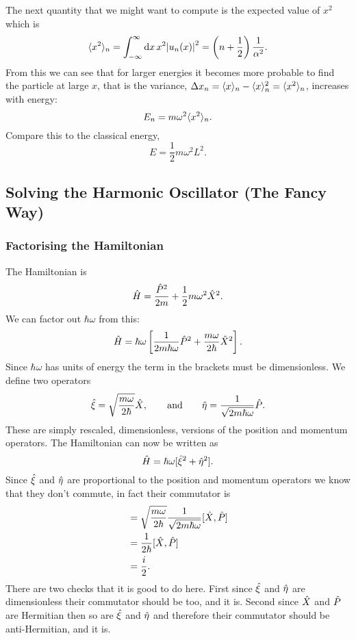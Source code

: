     The next quantity that we might want to compute is the expected value of \(x^2\) which is
    \[\langle{x^2}\rangle_n = \int_{-\infty}^{\infty} \dd{x} x^2\abs{u_n(x)}^2 = \left(n + \frac{1}{2}\right)\frac{1}{\alpha^2}.\]
    From this we can see that for larger energies it becomes more probable to find the particle at large \(x\), that is the variance, \(\Delta x_n = \langle{x}\rangle_n - \langle{x}\rangle_n^2 = \langle{x^2}\rangle_n\), increases with energy:
    \[E_n = m\omega^2\langle{x^2}\rangle_n.\]
    Compare this to the classical energy,
    \[E = \frac{1}{2}m\omega^2L^2.\]
    
    \subsection{Solving the Harmonic Oscillator (The Fancy Way)}
    \subsubsection{Factorising the Hamiltonian}
    The Hamiltonian is
    \[\hat{H} = \frac{\hat{P}^2}{2m} + \frac{1}{2}m\omega^2\hat{X}^2.\]
    We can factor out \(\hbar\omega\) from this:
    \[\hat{H} = \hbar\omega\left[\frac{1}{2m\hbar\omega}\hat{P}^2 + \frac{m\omega}{2\hbar}\hat{X}^2 \right].\]
    Since \(\hbar\omega\) has units of energy the term in the brackets must be dimensionless.
    We define two operators
    \[\hat{\xi} = \sqrt{\frac{m\omega}{2\hbar}}\hat{X}, \qquad\text{and}\qquad \hat{\eta} = \frac{1}{\sqrt{2m\hbar\omega}}\hat{P}.\]
    These are simply rescaled, dimensionless, versions of the position and momentum operators.
    The Hamiltonian can now be written as
    \[\hat{H} = \hbar\omega[\hat{\xi}^2 + \hat{\eta}^2].\]
    Since \(\hat{\xi}\) and \(\hat{\eta}\) are proportional to the position and momentum operators we know that they don't commute, in fact their commutator is
    \begin{align*}
        [\operator{\xi}, \operator{\eta}] &= \sqrt{\frac{m\omega}{2\hbar}}\frac{1}{\sqrt{2m\hbar\omega}} [\operator{X}, \operator{P}]\\
        &= \frac{1}{2\hbar}[\operator{X}, \operator{P}]\\
        &= \frac{i}{2}.
    \end{align*}
    There are two checks that it is good to do here.
    First since \(\hat{\xi}\) and \(\hat{\eta}\) are dimensionless their commutator should be too, and it is.
    Second since \(\hat{X}\) and \(\hat{P}\) are Hermitian then so are \(\hat{\xi}\) and \(\hat{\eta}\) and therefore their commutator should be anti-Hermitian, and it is.
    
